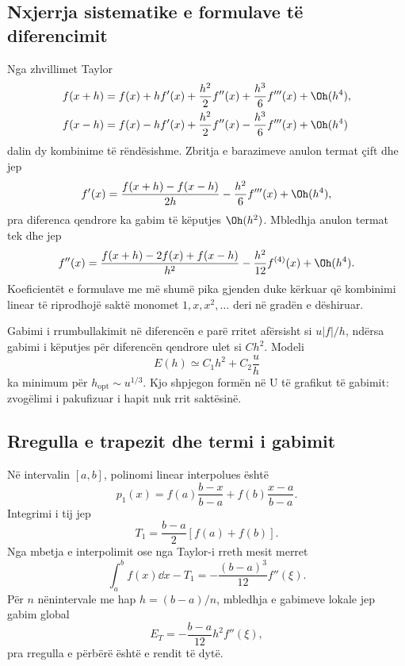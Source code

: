 \subsection{Nxjerrja sistematike e formulave të diferencimit}
Nga zhvillimet Taylor
\begin{align}
 f(x+h)&=f(x)+hf'(x)+\frac{h^2}{2}f''(x)+\frac{h^3}{6}f'''(x)+\Oh(h^4),\\
 f(x-h)&=f(x)-hf'(x)+\frac{h^2}{2}f''(x)-\frac{h^3}{6}f'''(x)+\Oh(h^4)
\end{align}
dalin dy kombinime të rëndësishme. Zbritja e barazimeve anulon termat çift dhe jep
\begin{equation}
 f'(x)=\frac{f(x+h)-f(x-h)}{2h}-\frac{h^2}{6}f'''(x)+\Oh(h^4),
\end{equation}
pra diferenca qendrore ka gabim të këputjes $\Oh(h^2)$. Mbledhja anulon termat tek dhe jep
\begin{equation}
 f''(x)=\frac{f(x+h)-2f(x)+f(x-h)}{h^2}-\frac{h^2}{12}f^{(4)}(x)+\Oh(h^4).
\end{equation}
Koeficientët e formulave me më shumë pika gjenden duke kërkuar që kombinimi linear të riprodhojë saktë monomet $1,x,x^2,\ldots$ deri në gradën e dëshiruar.

Gabimi i rrumbullakimit në diferencën e parë rritet afërsisht si $u|f|/h$, ndërsa gabimi i këputjes për diferencën qendrore ulet si $C h^2$. Modeli
\begin{equation}
 E(h)\simeq C_1h^2+C_2\frac{u}{h}
\end{equation}
ka minimum për $h_{\mathrm{opt}}\sim u^{1/3}$. Kjo shpjegon formën në U të grafikut të gabimit: zvogëlimi i pakufizuar i hapit nuk rrit saktësinë.

\subsection{Rregulla e trapezit dhe termi i gabimit}
Në intervalin $[a,b]$, polinomi linear interpolues është
\begin{equation}
 p_1(x)=f(a)\frac{b-x}{b-a}+f(b)\frac{x-a}{b-a}.
\end{equation}
Integrimi i tij jep
\begin{equation}
 T_1=\frac{b-a}{2}[f(a)+f(b)].
\end{equation}
Nga mbetja e interpolimit ose nga Taylor-i rreth mesit merret
\begin{equation}
 \int_a^b f(x)\dd x-T_1=-\frac{(b-a)^3}{12}f''(\xi).
\end{equation}
Për $n$ nënintervale me hap $h=(b-a)/n$, mbledhja e gabimeve lokale jep gabim global
\begin{equation}
 E_T=-\frac{b-a}{12}h^2 f''(\xi),
\end{equation}
pra rregulla e përbërë është e rendit të dytë.

